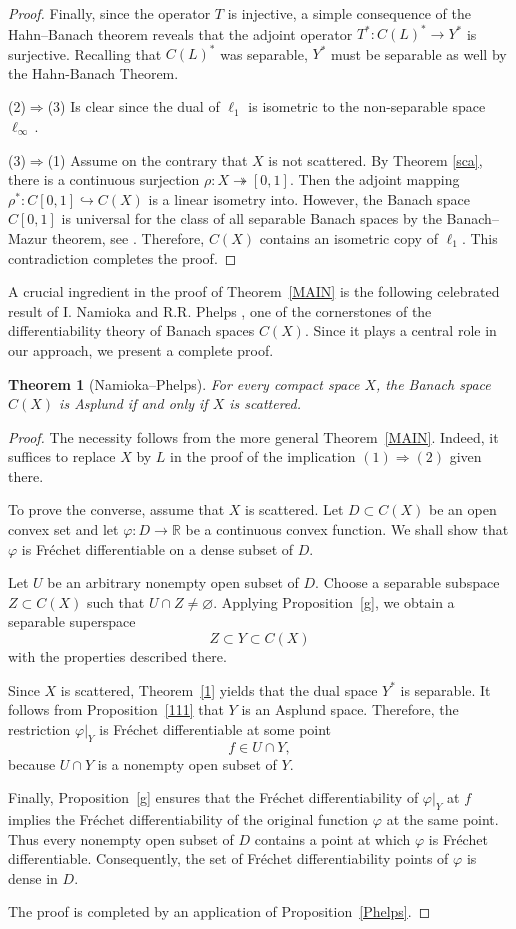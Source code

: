 \documentclass[12pt]{amsart}
\theoremstyle{plain}
\newtheorem{theorem}{Theorem}[section]
\theoremstyle{definition}
\theoremstyle{remark}
\def\vv{\varphi}
\begin{document}
\begin{proof}
Finally, since the operator $T$ is injective, a simple consequence of the Hahn--Banach theorem reveals that the adjoint operator $T^*: C(L)^*\to Y^*$ is
surjective. Recalling that $C(L)^*$ was separable, $Y^*$ must be separable as well by the Hahn-Banach Theorem.

\smallskip
(2)$\Longrightarrow$(3) Is clear since the dual of $\ell_1$ is isometric to the non-separable space $\ell_\infty\,$.

\smallskip
(3)$\Longrightarrow$(1) Assume on the contrary that $X$ is not scattered. By Theorem \ref{sca}, there is a continuous surjection $\rho: X\twoheadrightarrow [0,1]$.
Then the adjoint mapping $\rho^{*}: C[0,1]\hookrightarrow C(X)$ is a linear isometry into. However, the Banach space $C[0,1]$ is universal for the class of all separable Banach spaces by the
Banach--Mazur theorem, see \cite[Proposition 1.5]{Pelczynski-Bessaga}. Therefore, $C(X)$ contains an isometric copy of $\ell_1$. This contradiction completes the proof.
\end{proof}
A crucial ingredient in the proof of Theorem~\ref{MAIN} is the following celebrated result of I. Namioka and R.R. Phelps \cite{np}, one of the cornerstones of the differentiability theory of Banach spaces $C(X)$. Since it plays a central role in our approach, we present a complete proof.
\begin{theorem}[Namioka--Phelps]\label{Namioka+Phelps} For every compact space $X$,
the Banach space $C(X)$ is Asplund if and only if $X$ is scattered.
\end{theorem}
\begin{proof}
The necessity follows from the more general Theorem~\ref{MAIN}. Indeed, it suffices to replace $X$ by $L$ in the proof of the implication
$(1)\Rightarrow(2)$ given there.

To prove the converse, assume that $X$ is scattered. Let $D\subset C(X)$ be an open convex set and let
$\vv:D\to\mathbb{R}$ be a continuous convex function. We shall show that $\vv$ is Fr\'echet differentiable on a dense subset of $D$.

Let $U$ be an arbitrary nonempty open subset of $D$. Choose a separable subspace
$Z\subset C(X)$ such that $U\cap Z\neq\varnothing$. Applying Proposition~\ref{g}, we obtain a separable superspace
\[
Z\subset Y\subset C(X)
\]
with the properties described there.

Since $X$ is scattered, Theorem~\ref{1} yields that the dual space $Y^{*}$ is separable. It follows from Proposition~\ref{111} that $Y$ is an Asplund space. Therefore, the restriction
$\vv|_{Y}$ is Fr\'echet differentiable at some point
\[
f\in U\cap Y,
\]
because $U\cap Y$ is a nonempty open subset of $Y$.

Finally, Proposition~\ref{g} ensures that the Fr\'echet differentiability of $\vv|_{Y}$ at $f$ implies the Fr\'echet differentiability of the original function $\vv$ at the same point. Thus every nonempty open subset of $D$ contains a point at which $\vv$ is Fr\'echet differentiable. Consequently, the set of Fr\'echet differentiability points of $\vv$ is dense in $D$.

The proof is completed by an application of Proposition~\ref{Phelps}.
\end{proof}
\end{document}

